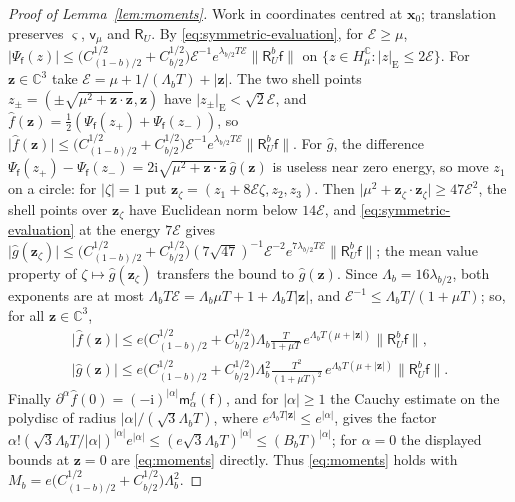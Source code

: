 \documentclass[aps,prl,reprint,longbibliography,raggedbottom]{revtex4-2}
\newcommand{\C}{\mathbb C}
\newcommand{\ii}{\mathrm i}
\newcommand{\norm}[1]{\lVert #1\rVert}
\newcommand{\abs}[1]{\lvert #1\rvert}
\newcommand{\Res}{\mathsf R}
\newcommand{\cov}{\mathsf v}
\newcommand{\sx}{\mathsf f}
\newcommand{\bx}{\mathbf x}
\newcommand{\bz}{\mathbf z}
\newcommand{\Energy}{\mathcal E}
\begin{document}
\begin{proof}[Proof of Lemma~\ref{lem:moments}]
Work in coordinates centred at $\bx_0$; translation preserves
$\varsigma$, $\cov_\mu$ and $\Res_U$. By \eqref{eq:symmetric-evaluation},
for $\Energy\ge\mu$,
$\abs{\Psi_\sx(z)}\le\bigl(C_{(1-b)/2}^{1/2}+C_{b/2}^{1/2}\bigr)\Energy^{-1}e^{\lambda_{b/2}T\Energy}\norm{\Res_U^b\sx}$
on $\{z\in H_\mu^{\C}:\abs z_{\mathrm E}\le2\Energy\}$. For $\bz\in\C^3$ take
$\Energy=\mu+1/(\Lambda_bT)+\abs\bz$. The two shell points
$z_\pm=(\pm\sqrt{\mu^2+\bz\cdot\bz},\bz)$ have
$\abs{z_\pm}_{\mathrm E}<\sqrt2\Energy$, and
$\hat f(\bz)=\frac12(\Psi_\sx(z_+)+\Psi_\sx(z_-))$, so
$\abs{\hat f(\bz)}\le\bigl({C_{(1-b)/2}^{1/2}+C_{b/2}^{1/2}}\bigr)\Energy^{-1}e^{\lambda_{b/2}T\Energy}\norm{\Res_U^b\sx}$.
For $\hat g$, the difference ${\Psi_\sx(z_+)-\Psi_\sx(z_-)}=2\ii\sqrt{\mu^2+\bz\cdot\bz}\,\hat g(\bz)$
is useless near zero energy, so move $z_1$ on a circle: for
$\abs\zeta=1$ put $\bz_\zeta=(z_1+8\Energy\zeta,z_2,z_3)$. Then
$\abs{\mu^2+\bz_\zeta\cdot\bz_\zeta}\ge47\Energy^2$, the shell points
over $\bz_\zeta$ have Euclidean norm below $14\Energy$, and
\eqref{eq:symmetric-evaluation} at the energy $7\Energy$ gives
$\abs{\hat g(\bz_\zeta)}\le\bigl(C_{(1-b)/2}^{1/2}+C_{b/2}^{1/2}\bigr)(7\sqrt{47})^{-1}\Energy^{-2}e^{7\lambda_{b/2}T\Energy}\norm{\Res_U^b\sx}$;
the mean value property of $\zeta\mapsto\hat g(\bz_\zeta)$ transfers
the bound to $\hat g(\bz)$.
Since $\Lambda_b=16\lambda_{b/2}$, both exponents are at most
$\Lambda_bT\Energy=\Lambda_b\mu T+1+\Lambda_bT\abs\bz$, and
$\Energy^{-1}\le\Lambda_bT/(1+\mu T)$; so, for all $\bz\in\C^3$,
\[
\begin{gathered}
\abs{\hat f(\bz)}\le e\bigl(C_{(1-b)/2}^{1/2}+C_{b/2}^{1/2}\bigr)\Lambda_b\frac T{1+\mu T}\,
e^{\Lambda_bT(\mu+\abs\bz)}\norm{\Res_U^b\sx},\\
\abs{\hat g(\bz)}\le e\bigl(C_{(1-b)/2}^{1/2}+C_{b/2}^{1/2}\bigr)\Lambda_b^2\frac{T^2}{(1+\mu T)^2}\,
e^{\Lambda_bT(\mu+\abs\bz)}\norm{\Res_U^b\sx}.
\end{gathered}
\]
Finally $\partial^\alpha\hat f(0)=(-\ii)^{\abs\alpha}\mathsf m_\alpha^f(\sx)$,
and for $\abs\alpha\ge1$ the Cauchy estimate on the polydisc of radius
$\abs\alpha/(\sqrt3\Lambda_bT)$, where $e^{\Lambda_bT\abs\bz}\le e^{\abs\alpha}$,
gives the factor $\alpha!(\sqrt3\Lambda_bT/\abs\alpha)^{\abs\alpha}e^{\abs\alpha}
\le(e\sqrt3\Lambda_bT)^{\abs\alpha}\le(B_bT)^{\abs\alpha}$; for
$\alpha=0$ the displayed bounds at $\bz=0$ are \eqref{eq:moments}
directly. Thus
\eqref{eq:moments} holds with
$M_b=e\bigl(C_{(1-b)/2}^{1/2}+C_{b/2}^{1/2}\bigr)\Lambda_b^2$.
\end{proof}
\end{document}
